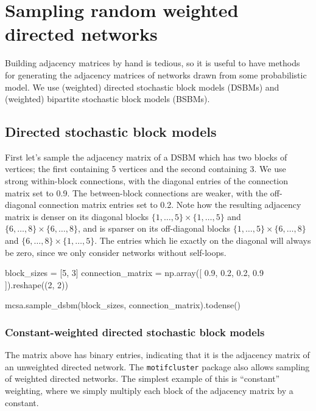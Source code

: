 \documentclass{article}
\begin{document}
\section{Sampling random weighted directed networks}

Building adjacency matrices by hand is tedious,
so it is useful to have methods for generating
the adjacency matrices of networks drawn from some probabilistic model.
We use (weighted) directed stochastic block models (DSBMs) and
(weighted) bipartite stochastic block models (BSBMs).

\subsection{Directed stochastic block models}

First let's sample the adjacency matrix of a DSBM
which has two blocks of vertices;
the first containing 5 vertices and the second containing 3.
We use strong within-block connections,
with the diagonal entries of the connection matrix set to 0.9.
The between-block connections are weaker, with the off-diagonal
connection matrix entries set to 0.2.
Note how the resulting adjacency matrix is denser
on its diagonal blocks
$\{1, \dots, 5\} \times \{1, \dots, 5\}$
and
$\{6, \dots, 8\} \times \{6, \dots, 8\}$,
and is sparser on its off-diagonal blocks
$\{1, \dots, 5\} \times \{6, \dots, 8\}$
and
$\{6, \dots, 8\} \times \{1, \dots, 5\}$.
The entries which lie exactly on the diagonal will
always be zero,
since we only consider networks without self-loops.

\begin{pyconsole}
block_sizes = [5, 3]
connection_matrix = np.array([
  0.9, 0.2,
  0.2, 0.9
]).reshape((2, 2))
\end{pyconsole}

\pagebreak

\begin{pyconsole}
mcsa.sample_dsbm(block_sizes, connection_matrix).todense()
\end{pyconsole}

\subsubsection{Constant-weighted directed stochastic block models}

The matrix above has binary entries,
indicating that it is the adjacency matrix of an unweighted
directed network.
The \texttt{motifcluster} package also allows sampling of weighted directed networks.
The simplest example of this is ``constant'' weighting,
where we simply multiply each block of the adjacency matrix by a constant.
\end{document}
